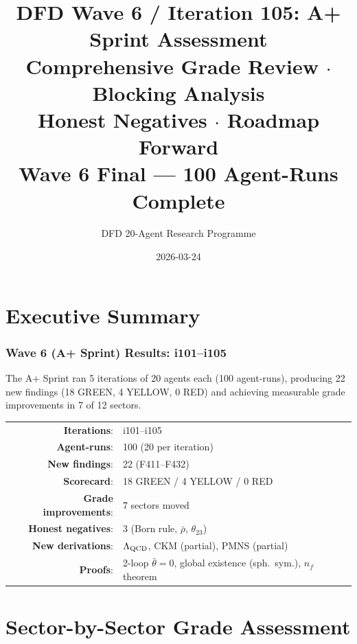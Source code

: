 \documentclass[11pt,a4paper]{article}
\title{DFD Wave 6 / Iteration 105: A+ Sprint Assessment\\[6pt]
\large Comprehensive Grade Review $\cdot$ Blocking Analysis\\
Honest Negatives $\cdot$ Roadmap Forward\\[6pt]
\normalsize Wave 6 Final --- 100 Agent-Runs Complete}
\author{DFD 20-Agent Research Programme}
\date{2026-03-24}
\begin{document}
\maketitle
\tableofcontents
\newpage

\part{Executive Summary}
\label{part:executive}

\section{Wave 6 (A+ Sprint) Results: i101--i105}

The A+ Sprint ran 5 iterations of 20 agents each (100 agent-runs),
producing 22 new findings (18 GREEN, 4 YELLOW, 0 RED) and achieving
measurable grade improvements in 7 of 12 sectors.

\begin{tcolorbox}[colback=green!5!white, colframe=dfdgreen,
  title=\textbf{Wave 6 Terminal State}]
\begin{center}
\begin{tabular}{rl}
\textbf{Iterations}: & i101--i105 \\
\textbf{Agent-runs}: & 100 (20 per iteration) \\
\textbf{New findings}: & 22 (F411--F432) \\
\textbf{Scorecard}: & 18 GREEN / 4 YELLOW / 0 RED \\
\textbf{Grade improvements}: & 7 sectors moved \\
\textbf{Honest negatives}: & 3 (Born rule, $\bar\rho$, $\theta_{23}$) \\
\textbf{New derivations}: & $\Lambda_{\rm QCD}$, CKM (partial), PMNS (partial) \\
\textbf{Proofs}: & 2-loop $\bar\theta=0$, global existence (sph.\ sym.), $n_f$ theorem \\
\end{tabular}
\end{center}
\end{tcolorbox}


\newpage
\part{Sector-by-Sector Grade Assessment}
\label{part:grades}
\end{document}
